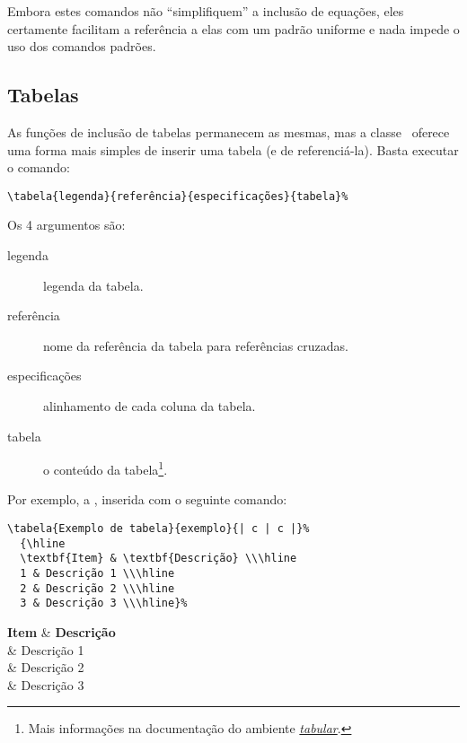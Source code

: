Embora estes comandos não ``simplifiquem'' a inclusão de equações, eles
certamente facilitam a referência a elas com um padrão uniforme e nada impede o
uso dos comandos padrões.

%


\subsection{Tabelas}
As funções de inclusão de tabelas permanecem as mesmas, mas a classe \unbcic\
oferece uma forma mais simples de inserir uma tabela (e de referenciá-la). Basta
executar o comando:

\begin{verbatim}
\tabela{legenda}{referência}{especificações}{tabela}%
\end{verbatim}

Os 4 argumentos são:
\begin{description}
\item[legenda] legenda da tabela.
\item[referência] nome da referência da tabela para referências cruzadas.
\item[especificações] alinhamento de cada coluna da tabela.
\item[tabela] o conteúdo da tabela\footnote{Mais informações na documentação do
ambiente \emph{\href{http://en.wikibooks.org/wiki/LaTeX/Tables}{tabular}}.}.
\end{description}

Por exemplo, a , inserida com o seguinte comando:
\begin{verbatim}
\tabela{Exemplo de tabela}{exemplo}{| c | c |}%
  {\hline
  \textbf{Item} & \textbf{Descrição} \\\hline
  1 & Descrição 1 \\\hline
  2 & Descrição 2 \\\hline
  3 & Descrição 3 \\\hline}%
\end{verbatim}

%
  {\hline
  \textbf{Item} & \textbf{Descrição} \\ & Descrição 1 \\ & Descrição 2 \\ & Descrição 3 \\\hline}%

